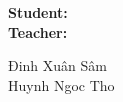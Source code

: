 \documentclass[11pt,a4paper]{article}
\begin{document}
\begin{minipage}{0.4\textwidth}
	\begin{flushleft}
		\textbf{Student:} \\
		\textbf{Teacher:} \\
	\end{flushleft}
\end{minipage}
\begin{minipage}{0.4\textwidth}
	\begin{flushleft}
		\textsf{Đinh Xu\^an S\^am} \\
		Huynh Ngoc Tho
	\end{flushleft}
\end{minipage}
\end{document}
